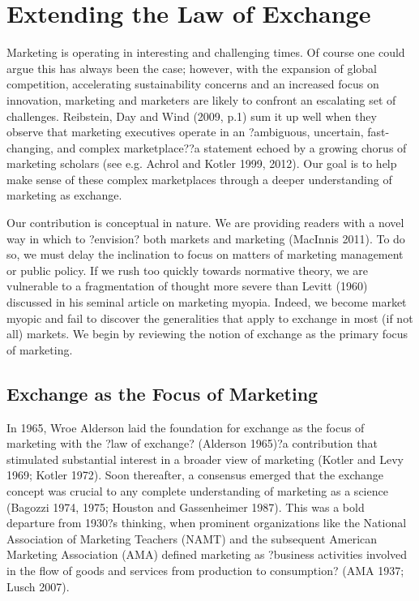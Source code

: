 \chapter{Extending the Law of Exchange\label{law}}

Marketing is operating in interesting and challenging times. Of course one could argue this has always been the case; however, with the expansion of global competition, accelerating sustainability concerns and an increased focus on innovation, marketing and marketers are likely to confront an escalating set of challenges. Reibstein, Day and Wind (2009, p.1) sum it up well when they observe that marketing executives operate in an ?ambiguous, uncertain, fast-changing, and complex marketplace??a statement echoed by a growing chorus of marketing scholars (see e.g. Achrol and Kotler 1999, 2012). Our goal is to help make sense of these complex marketplaces through a deeper understanding of marketing as exchange. 

Our contribution is conceptual in nature. We are providing readers with a novel way in which to ?envision? both markets and marketing (MacInnis 2011). To do so, we must delay the inclination to focus on matters of marketing management or public policy. If we rush too quickly towards normative theory, we are vulnerable to a fragmentation of thought more severe than Levitt (1960) discussed in his seminal article on marketing myopia. Indeed, we become market myopic and fail to discover the generalities that apply to exchange in most (if not all) markets. We begin by reviewing the notion of exchange as the primary focus of marketing. 

\section{Exchange as the Focus of Marketing}
In 1965, Wroe Alderson laid the foundation for exchange as the focus of marketing with the ?law of exchange?  (Alderson 1965)?a contribution that stimulated substantial interest in a broader view of marketing (Kotler and Levy 1969; Kotler 1972).  Soon thereafter, a consensus emerged that the exchange concept was crucial to any complete understanding of marketing as a science (Bagozzi 1974, 1975; Houston and Gassenheimer 1987). This was a bold departure from 1930?s thinking, when prominent organizations like the National Association of Marketing Teachers (NAMT) and the subsequent American Marketing Association (AMA) defined marketing as ?business activities involved in the flow of goods and services from production to consumption? (AMA 1937; Lusch 2007). 

